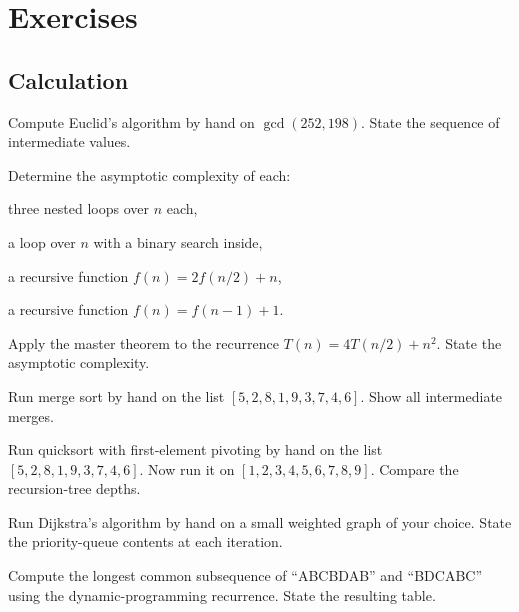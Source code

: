 \section{Exercises}

\subsection*{Calculation}

\begin{exercise}
Compute Euclid's algorithm by hand on $\gcd(252, 198)$. State the sequence of intermediate values.
\end{exercise}

\begin{exercise}
Determine the asymptotic complexity of each: \begin{enumerate*}[label=(\alph*)] \item three nested loops over $n$ each, \item a loop over $n$ with a binary search inside, \item a recursive function $f(n) = 2 f(n/2) + n$, \item a recursive function $f(n) = f(n-1) + 1$. \end{enumerate*}
\end{exercise}

\begin{exercise}
Apply the master theorem to the recurrence $T(n) = 4 T(n/2) + n^2$. State the asymptotic complexity.
\end{exercise}

\begin{exercise}
Run merge sort by hand on the list $[5, 2, 8, 1, 9, 3, 7, 4, 6]$. Show all intermediate merges.
\end{exercise}

\begin{exercise}
Run quicksort with first-element pivoting by hand on the list $[5, 2, 8, 1, 9, 3, 7, 4, 6]$. Now run it on $[1, 2, 3, 4, 5, 6, 7, 8, 9]$. Compare the recursion-tree depths.
\end{exercise}

\begin{exercise}
Run Dijkstra's algorithm by hand on a small weighted graph of your choice. State the priority-queue contents at each iteration.
\end{exercise}

\begin{exercise}
Compute the longest common subsequence of ``ABCBDAB'' and ``BDCABC'' using the dynamic-programming recurrence. State the resulting table.
\end{exercise}

